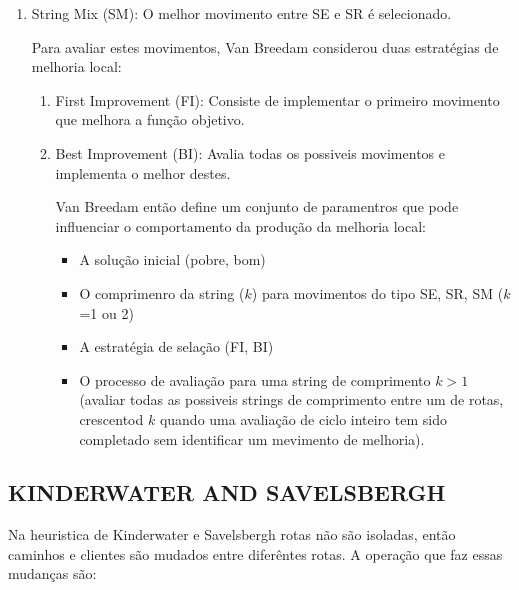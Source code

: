 \begin{enumerate}
\item String Mix (SM): O melhor movimento entre SE e SR é selecionado.

 Para avaliar estes movimentos, Van Breedam considerou duas estratégias de melhoria local:

\begin{enumerate}
\item First Improvement (FI): Consiste de implementar o primeiro movimento que melhora a função
objetivo.
\item Best Improvement (BI): Avalia todas os possiveis movimentos e implementa o melhor destes.

 Van Breedam então define um conjunto de paramentros que pode influenciar o comportamento da
produção da melhoria local:

\begin{itemize}
\item A solução inicial (pobre, bom)
\item O comprimenro da string ($k$) para movimentos do tipo SE, SR, SM ($k$=1 ou 2)
\item A estratégia de selação (FI, BI)
\item O processo de avaliação para uma string de comprimento $k>1$ (avaliar todas as possiveis
strings de comprimento entre um de rotas, crescentod $k$ quando uma avaliação de ciclo inteiro tem
sido completado sem identificar um mevimento de melhoria).
\end{itemize}

\end{enumerate}

\end{enumerate}

\subsection{KINDERWATER AND SAVELSBERGH}

 Na heuristica de  Kinderwater e Savelsbergh rotas não são isoladas, então caminhos e clientes são
mudados entre diferêntes rotas. A operação que faz essas mudanças são:

